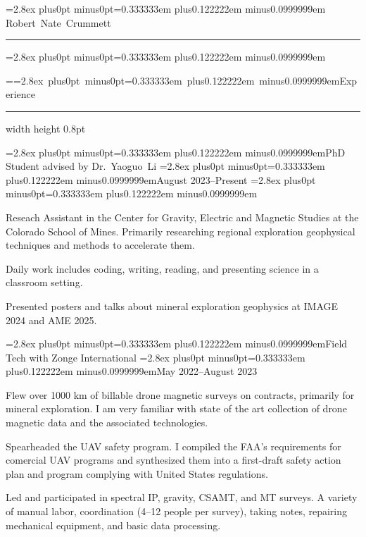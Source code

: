 


\frenchspacing
{}

\def\fontspacing{\baselineskip=2.8ex plus0pt minus0pt\spaceskip=0.333333em plus0.122222em minus0.0999999em}

\twentyrm
\fontspacing
\noindent
Robert~Nate~Crummett

\kern2pt
\hrule height 1pt
\smallskip

\eightrm
\fontspacing
{}
\bigskip

=\hbox{\sixteenrm\fontspacing Experience}
{}
\kern-1.5pt
\hrule width  height 0.8pt
\medskip

\noindent
{\twelverm\fontspacing PhD Student advised by Dr.~Yaoguo~Li}
\hfill{\eightit\fontspacing August 2023--Present}
\ninerm
\fontspacing

\kern-4pt
\beginenumerate
\item Reseach Assistant in the Center for Gravity, Electric and Magnetic Studies at the Colorado School of Mines.
Primarily researching regional exploration geophysical techniques and methods to accelerate them.
\item Daily work includes coding, writing, reading, and presenting science in a classroom setting.
\item Presented posters and talks about mineral exploration geophysics at IMAGE 2024 and AME 2025.
\endenumerate

\noindent
{\twelverm\fontspacing Field Tech with Zonge International}
\hfill{\eightit\fontspacing May 2022--August 2023}

\kern-4pt
\beginenumerate
\item Flew over 1000 km of billable drone magnetic surveys on contracts, primarily for mineral exploration.
I am very familiar with state of the art collection of drone magnetic data and the associated technologies.
\item Spearheaded the UAV safety program.
I compiled the FAA's requirements for comercial UAV programs and synthesized them into a first-draft safety action plan and program complying with United States regulations.
\item Led and participated in spectral IP, gravity, CSAMT, and MT surveys.
A variety of manual labor, coordination (4--12 people per survey), taking notes, repairing mechanical equipment, and basic data processing.
\endenumerate
\smallskip

